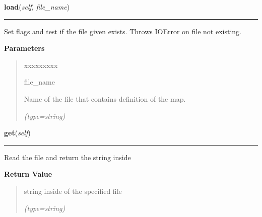 \hspace{.8\funcindent}\begin{boxedminipage}{\funcwidth}

    \raggedright \textbf{load}(\textit{self}, \textit{file\_name})

    \vspace{-1.5ex}

    \rule{\textwidth}{0.5\fboxrule}
\setlength{\parskip}{2ex}
    Set flags and test if the file given exists. Throws IOError on file not
    existing.

\setlength{\parskip}{1ex}
      \textbf{Parameters}
      \vspace{-1ex}

      \begin{quote}
        \begin{Ventry}{xxxxxxxxx}

          \item[file\_name]

          Name of the file that contains definition of the map.

            {\it (type=string)}

        \end{Ventry}

      \end{quote}

    \end{boxedminipage}

    \label{UnBlockMe:Map:MapReader:MapReader:get}

    \vspace{0.5ex}

\hspace{.8\funcindent}\begin{boxedminipage}{\funcwidth}

    \raggedright \textbf{get}(\textit{self})

    \vspace{-1.5ex}

    \rule{\textwidth}{0.5\fboxrule}
\setlength{\parskip}{2ex}
    Read the file and return the string inside

\setlength{\parskip}{1ex}
      \textbf{Return Value}
    \vspace{-1ex}

      \begin{quote}
      string inside of the specified file

      {\it (type=string)}

      \end{quote}

    \end{boxedminipage}


